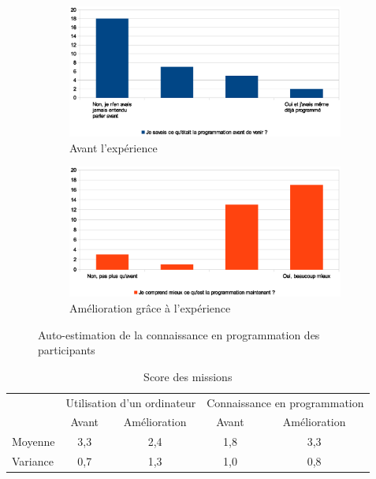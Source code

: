 \begin{figure}
  \begin{center}
    \begin{subfigure}[b]{\textwidth}
      \begin{center}
        \includegraphics[width=\textwidth]{content/8-validation/images/prog-avant}
        \caption{Avant l'expérience}
      \end{center}
    \end{subfigure}
    \begin{subfigure}[b]{\textwidth}
      \begin{center}
        \includegraphics[width=\textwidth]{content/8-validation/images/prog-apres}
        \caption{Amélioration grâce à l'expérience}
      \end{center}
    \end{subfigure}
    \caption{Auto-estimation de la connaissance en programmation des participants}
    \label{fig:niveau-prog}
  \end{center}
\end{figure}

\begin{table}
  \begin{center}
    \begin{tabular}{m{38pt}|cc|cc}
               & \multicolumn{2}{c|}{Utilisation d'un ordinateur} & \multicolumn{2}{c}{Connaissance en programmation} \\
               & Avant & Amélioration                             & Avant & Amélioration \\ \hline
      Moyenne  & 3,3 & 2,4 & 1,8 & 3,3 \\
      Variance & 0,7 & 1,3 & 1,0 & 0,8 \\
    \end{tabular}
  \end{center}
  \caption{Score des missions}
  \label{tab:form-info}
\end{table}

